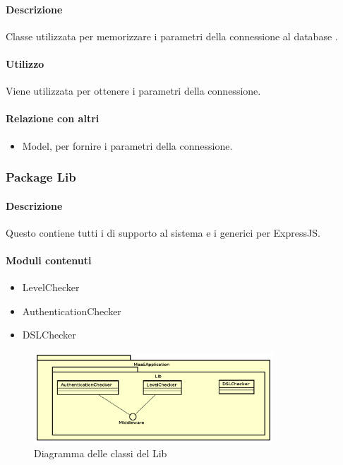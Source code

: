 \paragraph*{Descrizione}
Classe utilizzata per memorizzare i parametri della connessione al database .

\paragraph*{Utilizzo}
Viene utilizzata per ottenere i parametri della connessione.

\paragraph*{Relazione con altri }
\begin{itemize}
\item Model, per fornire i parametri della connessione.
\end{itemize}

\subsubsection{Package Lib}
\paragraph*{Descrizione}
Questo  contiene tutti i  di supporto al sistema e i  generici per ExpressJS.

\paragraph*{Moduli contenuti}
\begin{itemize}
\item LevelChecker
\item AuthenticationChecker
\item DSLChecker
\end{itemize}


\begin{figure}[H]
\centering
\includegraphics[width=0.8\textwidth]{res/sections/backend/lib.png}
\caption{Diagramma delle classi del  Lib}
\end{figure}

